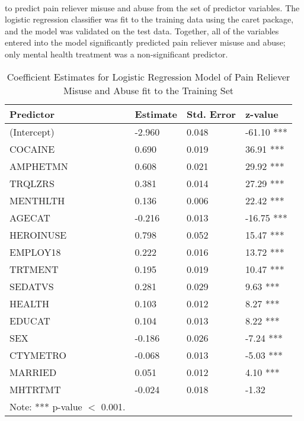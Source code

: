 \\\documentclass[sigconf]{acmart}
\begin{document}
to predict pain reliever misuse and abuse
from the set of predictor variables. The logistic regression classifier was fit to 
the training data using the caret package, and the model was validated on the test 
data. Together, all of the variables entered into the model significantly predicted 
pain reliever misuse and abuse; only mental health treatment was a non-significant
predictor. 



\begin{table}
  \caption{Coefficient Estimates for Logistic Regression Model 
  of Pain Reliever Misuse and Abuse fit to the Training Set}
  \label{tab:freq}
  \begin{tabular}{llll}
    \toprule
    Predictor&  Estimate& Std. Error& z-value  \\    
    \midrule
    (Intercept)& -2.960 &   0.048 & -61.10 ***  \\
    COCAINE  &    0.690 &   0.019 &  36.91 ***  \\
    AMPHETMN &    0.608 &   0.021 &  29.92 ***  \\
    TRQLZRS  &    0.381 &   0.014 &  27.29 ***  \\
    MENTHLTH &    0.136 &   0.006 &  22.42 ***  \\
    AGECAT   &   -0.216 &   0.013 & -16.75 ***  \\
    HEROINUSE&    0.798 &   0.052 &  15.47 ***  \\  
    EMPLOY18 &    0.222 &   0.016 &  13.72 ***  \\
    TRTMENT  &    0.195 &   0.019 &  10.47 ***  \\
    SEDATVS  &    0.281 &   0.029 &   9.63 ***  \\   
    HEALTH   &    0.103 &   0.012 &   8.27 ***  \\
    EDUCAT   &    0.104 &   0.013 &   8.22 ***  \\   
    SEX      &   -0.186 &   0.026 &  -7.24 ***  \\
    CTYMETRO &   -0.068 &   0.013 &  -5.03 ***  \\
    MARRIED  &    0.051 &   0.012 &   4.10 ***  \\
    MHTRTMT  &   -0.024 &   0.018 &  -1.32     \\
    \bottomrule
    Note: *** p-value $<$ 0.001. &  &  
  \end{tabular}
\end{table}
\end{document}
